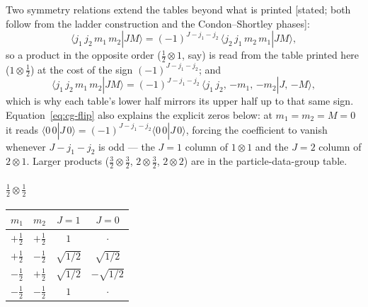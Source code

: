 \documentclass[11pt]{article}
\theoremstyle{plain}
\theoremstyle{definition}
\theoremstyle{remark}
\newcommand{\braket}[2]{\langle #1 | #2 \rangle}
\begin{document}
Two symmetry relations extend the tables beyond what is printed
[stated; both follow from the ladder construction and the
Condon--Shortley phases]:
\begin{equation}
  \braket{j_1\,j_2\,m_1\,m_2}{J M}
  = (-1)^{J - j_1 - j_2}\,
    \braket{j_2\,j_1\,m_2\,m_1}{J M},
  \label{eq:cg-exchange}
\end{equation}
so a product in the opposite order ($\tfrac12\otimes1$, say) is
read from the table printed here ($1\otimes\tfrac12$) at the cost
of the sign $(-1)^{J-j_1-j_2}$; and
\begin{equation}
  \braket{j_1\,j_2\,m_1\,m_2}{J M}
  = (-1)^{J - j_1 - j_2}\,
    \braket{j_1\,j_2,\,{-m_1},\,{-m_2}}{J,\,{-M}},
  \label{eq:cg-flip}
\end{equation}
which is why each table's lower half mirrors its upper half up to
that same sign. Equation~\eqref{eq:cg-flip} also explains the
explicit zeros below: at $m_1 = m_2 = M = 0$ it reads
$\braket{0\,0}{J\,0} = (-1)^{J-j_1-j_2}\braket{0\,0}{J\,0}$, forcing
the coefficient to vanish whenever $J - j_1 - j_2$ is odd --- the
$J = 1$ column of $1 \otimes 1$ and the $J = 2$ column of
$2 \otimes 1$. Larger products ($\tfrac32\otimes\tfrac32$,
$2\otimes\tfrac32$, $2\otimes2$) are in the particle-data-group
table.

\paragraph{$\tfrac12 \otimes \tfrac12$}
\begin{center}
\begin{tabular}{cc|cc}
\toprule
$m_1$ & $m_2$ & $J=1$ & $J=0$ \\
\midrule
$+\tfrac{1}{2}$ & $+\tfrac{1}{2}$ & $1$ & $\cdot$ \\
\midrule
$+\tfrac{1}{2}$ & $-\tfrac{1}{2}$ & $\sqrt{1/2}$ & $\sqrt{1/2}$ \\
$-\tfrac{1}{2}$ & $+\tfrac{1}{2}$ & $\sqrt{1/2}$ & $-\sqrt{1/2}$ \\
\midrule
$-\tfrac{1}{2}$ & $-\tfrac{1}{2}$ & $1$ & $\cdot$ \\
\bottomrule
\end{tabular}
\end{center}
\end{document}
